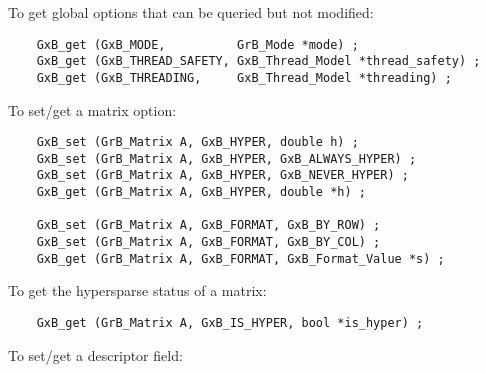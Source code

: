 \documentclass[12pt]{article}
\begin{document}
\noindent
To get global options that can be queried but not modified:

    {\footnotesize
    \begin{verbatim}
    GxB_get (GxB_MODE,          GrB_Mode *mode) ;
    GxB_get (GxB_THREAD_SAFETY, GxB_Thread_Model *thread_safety) ;
    GxB_get (GxB_THREADING,     GxB_Thread_Model *threading) ; \end{verbatim} }

\noindent
To set/get a matrix option:

    {\footnotesize
    \begin{verbatim}
    GxB_set (GrB_Matrix A, GxB_HYPER, double h) ;
    GxB_set (GrB_Matrix A, GxB_HYPER, GxB_ALWAYS_HYPER) ;
    GxB_set (GrB_Matrix A, GxB_HYPER, GxB_NEVER_HYPER) ;
    GxB_get (GrB_Matrix A, GxB_HYPER, double *h) ;

    GxB_set (GrB_Matrix A, GxB_FORMAT, GxB_BY_ROW) ;
    GxB_set (GrB_Matrix A, GxB_FORMAT, GxB_BY_COL) ;
    GxB_get (GrB_Matrix A, GxB_FORMAT, GxB_Format_Value *s) ; \end{verbatim} }

\noindent
To get the hypersparse status of a matrix:

    {\footnotesize
    \begin{verbatim}
    GxB_get (GrB_Matrix A, GxB_IS_HYPER, bool *is_hyper) ; \end{verbatim} }

\newpage
\noindent
To set/get a descriptor field:
\end{document}
